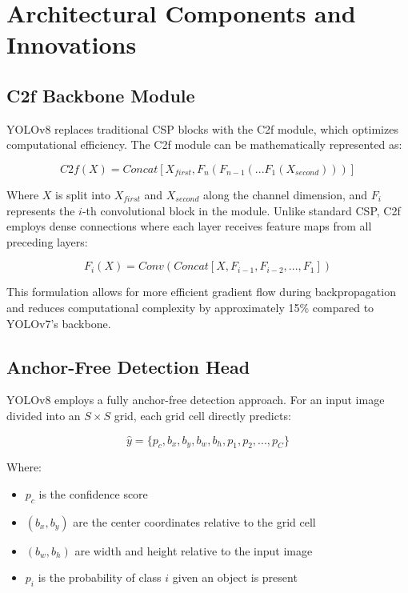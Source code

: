 \documentclass[11pt]{article}
\begin{document}
\section{Architectural Components and Innovations}

\subsection{C2f Backbone Module}
YOLOv8 replaces traditional CSP blocks with the C2f module, which optimizes computational efficiency. The C2f module can be mathematically represented as:

\begin{equation}
C2f(X) = Concat[X_{first}, F_n(F_{n-1}(...F_1(X_{second})))]
\end{equation}

Where $X$ is split into $X_{first}$ and $X_{second}$ along the channel dimension, and $F_i$ represents the $i$-th convolutional block in the module. Unlike standard CSP, C2f employs dense connections where each layer receives feature maps from all preceding layers:

\begin{equation}
F_i(X) = Conv(Concat[X, F_{i-1}, F_{i-2}, ..., F_1])
\end{equation}

This formulation allows for more efficient gradient flow during backpropagation and reduces computational complexity by approximately 15\% compared to YOLOv7's backbone.

\subsection{Anchor-Free Detection Head}
YOLOv8 employs a fully anchor-free detection approach. For an input image divided into an $S \times S$ grid, each grid cell directly predicts:

\begin{equation}
\hat{y} = \{p_c, b_x, b_y, b_w, b_h, p_1, p_2, ..., p_C\}
\end{equation}

Where:
\begin{itemize}
\item $p_c$ is the confidence score
\item $(b_x, b_y)$ are the center coordinates relative to the grid cell
\item $(b_w, b_h)$ are width and height relative to the input image
\item $p_i$ is the probability of class $i$ given an object is present
\end{itemize}
\end{document}
